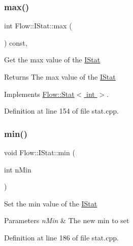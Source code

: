 \subsubsection{\texorpdfstring{max()}{max()}\hspace{0.1cm}{\footnotesize\ttfamily [2/2]}}
{\footnotesize\ttfamily int Flow\+::\+I\+Stat\+::max (\begin{DoxyParamCaption}{ }\end{DoxyParamCaption}) const\hspace{0.3cm}{\ttfamily [override]}, {\ttfamily [virtual]}}

Get the max value of the \hyperlink{class_flow_1_1_i_stat}{I\+Stat} \begin{DoxyReturn}{Returns}
The max value of the \hyperlink{class_flow_1_1_i_stat}{I\+Stat} 
\end{DoxyReturn}


Implements \hyperlink{class_flow_1_1_stat_a61757491d2145c37460a1cd32a8db8bb}{Flow\+::\+Stat$<$ int $>$}.



Definition at line 154 of file stat.\+cpp.

\hypertarget{class_flow_1_1_i_stat_a386890208cdad8b89259692c9adfbf07}{}\label{class_flow_1_1_i_stat_a386890208cdad8b89259692c9adfbf07} 
\subsubsection{\texorpdfstring{min()}{min()}\hspace{0.1cm}{\footnotesize\ttfamily [1/2]}}
{\footnotesize\ttfamily void Flow\+::\+I\+Stat\+::min (\begin{DoxyParamCaption}\item[{int}]{n\+Min }\end{DoxyParamCaption})}

Set the min value of the \hyperlink{class_flow_1_1_i_stat}{I\+Stat} 
\begin{DoxyParams}{Parameters}
{\em n\+Min} & The new min to set \\
\hline
\end{DoxyParams}


Definition at line 186 of file stat.\+cpp.

\hypertarget{class_flow_1_1_i_stat_a50cce8b3e14125d89165bce7cc9666ee}{}\label{class_flow_1_1_i_stat_a50cce8b3e14125d89165bce7cc9666ee} 
